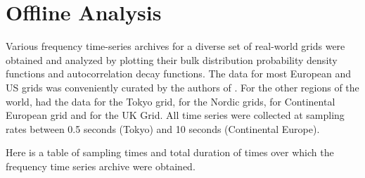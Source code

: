 \section[Offline/Postmortem Analysis]{Offline Analysis}
\label{sec:offline}

Various frequency time-series archives for a diverse set of real-world grids were obtained and analyzed by plotting their bulk distribution probability density functions and autocorrelation decay functions. The data for most European and US grids was conveniently curated by the authors of \cite{lrydin01, lrydinGithub}. For the other regions of the world, \cite{tokyo2017, tokyo2020} had the data for the Tokyo grid, \cite{nordic2018, nordic2019} for the Nordic grids, \cite{ce2019, ce2020} for Continental European grid and \cite{ukNationalGridESOData} for the UK Grid.
All time series were collected at sampling rates between 0.5 seconds (Tokyo) and 10 seconds (Continental Europe).

Here is a table of sampling times and total duration of times over which the frequency time series archive were obtained.

\renewcommand{\arraystretch}{1.0}

